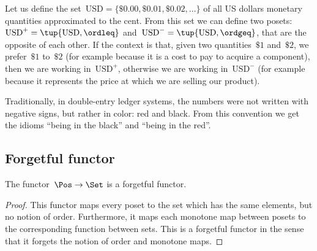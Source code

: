 \begin{example}
   Let us define the set~$\text{USD}=\{\$0.00,\$0.01,\$0.02,\dots\}$
   of all US dollars monetary quantities approximated to the cent.
   From this set we can define two posets:~$\text{USD}^{+} = \tup{\text{USD}, \ordleq}$ and~$\text{USD}^{-} = \tup{\text{USD}, \ordgeq}$, that are the opposite of each other.
   If the context is that, given two quantities~$\$1$ and~$\$2$, we prefer~$\$1$ to~$\$2$ (for example because it is a cost to pay to acquire a component), then we are working in~$\text{USD}^{+}$,
   otherwise we are working in~$\text{USD}^{-}$ (for example because it represents the price at which we are selling our product).

   Traditionally, in double-entry ledger systems, the numbers were not written with negative signs, but rather in color: red and black. From this convention we get the idioms ``being in the black'' and ``being in the red''.
\end{example}

\subsection{Forgetful functor}
\begin{lemma}
The functor~$\Pos \to \Set$ is a forgetful functor.
\end{lemma}
\begin{proof}
This functor maps every poset to the set which has the same elements, but no notion of order. Furthermore, it maps each monotone map between posets to the corresponding function between sets. This is a forgetful functor in the sense that it forgets the notion of order and monotone maps.
\end{proof}



